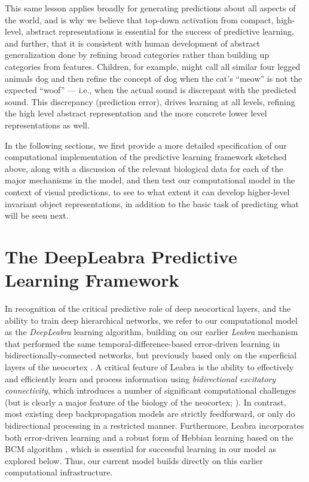 \documentclass[11pt,twoside]{article}
\newif\myifpdf
\begin{document}
This same lesson applies broadly for generating predictions about all aspects of the world, and is why we believe that top-down activation from compact, high-level, abstract representations is essential for the success of predictive learning, and further, that it is consistent with human development of abstract generalization done by refining broad categories rather than building up categories from features. Children, for example, might call all similar four legged animals dog and then refine the concept of dog when the cat's ``meow'' is not the expected ``woof'' --- i.e., when the actual sound is discrepant with the predicted sound. This discrepancy (prediction error), drives learning at all levels, refining the high level abstract representation and the more concrete lower level representations as well.

In the following sections, we first provide a more detailed specification of our computational implementation of the predictive learning framework sketched above, along with a discussion of the relevant biological data for each of the major mechanisms in the model, and then test our computational model in the context of visual predictions, to see to what extent it can develop higher-level invariant object representations, in addition to the basic task of predicting what will be seen next.

\section{The DeepLeabra Predictive Learning Framework}

In recognition of the critical predictive role of deep neocortical layers, and the ability to train deep hierarchical networks, we refer to our computational model as the {\em DeepLeabra} learning algorithm, building on our earlier {\em Leabra} mechanism that performed the same temporal-difference-based error-driven learning in bidirectionally-connected networks, but previously based only on the superficial layers of the neocortex \cite{OReillyHazyHerd16,OReillyMunakataFrankEtAl12,OReillyMunakata00,OReilly96}.
A critical feature of Leabra is the ability to effectively and efficiently learn and process information using {\em bidirectional excitatory connectivity}, which introduces a number of significant computational challenges (but is clearly a major feature of the biology of the neocortex; ). In contrast, most existing deep backpropagation models are strictly feedforward, or only do bidirectional processing in a restricted manner.  Furthermore, Leabra incorporates both error-driven learning and a robust form of Hebbian learning based on the BCM algorithm \cite{BienenstockCooperMunro82,CooperIntratorBlaisEtAl04,ShouvalWangWittenberg10}, which is essential for successful learning in our model as explored below.  Thus, our current model builds directly on this earlier computational infrastructure.
\end{document}
